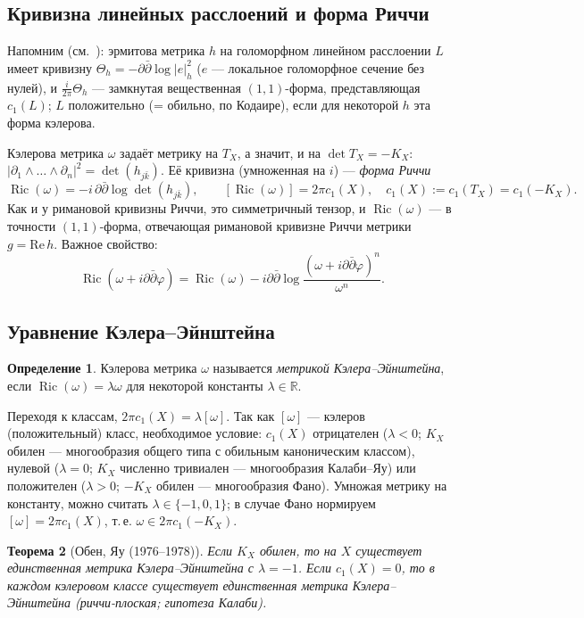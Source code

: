 \documentclass[11pt,a4paper]{article}
\theoremstyle{plain}
\newtheorem{theorem}{Теорема}[section]
\theoremstyle{definition}
\newtheorem{definition}[theorem]{Определение}
\theoremstyle{remark}
\newcommand{\R}{\mathbb{R}}
\DeclareMathOperator{\Ric}{Ric}
\begin{document}
\subsection{Кривизна линейных расслоений и форма Риччи}

Напомним (см.~\cite[гл.~0]{GH}): эрмитова метрика $h$ на голоморфном линейном расслоении $L$ имеет
кривизну $\Theta_h=-\partial\bar\partial\log|e|_h^2$ ($e$ --- локальное голоморфное сечение без нулей),
и $\frac i{2\pi}\Theta_h$ --- замкнутая вещественная $(1,1)$-форма, представляющая $c_1(L)$;
$L$ положительно (= обильно, по Кодаире), если для некоторой $h$ эта форма кэлерова.

Кэлерова метрика $\omega$ задаёт метрику на $T_X$, а значит, и на $\det T_X=-K_X$:
$|\partial_1\wedge\dots\wedge\partial_n|^2=\det(h_{j\bar k})$. Её кривизна (умноженная на $i$) ---
\emph{форма Риччи}
\[
\Ric(\omega)=-i\,\partial\bar\partial\log\det(h_{j\bar k}),\qquad [\Ric(\omega)]=2\pi c_1(X),\quad
c_1(X):=c_1(T_X)=c_1(-K_X).
\]
Как и у римановой кривизны Риччи, это симметричный тензор, и $\Ric(\omega)$ --- в точности
$(1,1)$-форма, отвечающая римановой кривизне Риччи метрики $g=\mathrm{Re}\,h$. Важное свойство:
\[
\Ric(\omega+i\partial\bar\partial\varphi)=\Ric(\omega)-i\partial\bar\partial\log\frac{(\omega+i\partial\bar\partial\varphi)^n}{\omega^n}.
\]

\subsection{Уравнение Кэлера--Эйнштейна}

\begin{definition}
Кэлерова метрика $\omega$ называется \emph{метрикой Кэлера--Эйнштейна}, если
$\Ric(\omega)=\lambda\omega$ для некоторой константы $\lambda\in\R$.
\end{definition}

Переходя к классам, $2\pi c_1(X)=\lambda[\omega]$. Так как $[\omega]$ --- кэлеров (положительный)
класс, необходимое условие: $c_1(X)$ отрицателен ($\lambda<0$; $K_X$ обилен --- многообразия общего
типа с обильным каноническим классом), нулевой ($\lambda=0$; $K_X$ численно тривиален ---
многообразия Калаби--Яу) или положителен ($\lambda>0$; $-K_X$ обилен --- многообразия Фано). Умножая
метрику на константу, можно считать $\lambda\in\{-1,0,1\}$; в случае Фано нормируем
$[\omega]=2\pi c_1(X)$, т.\,е. $\omega\in2\pi c_1(-K_X)$.

\begin{theorem}[Обен, Яу (1976--1978)]
Если $K_X$ обилен, то на $X$ существует единственная метрика Кэлера--Эйнштейна с $\lambda=-1$. Если $c_1(X)=0$, то в
каждом кэлеровом классе существует единственная метрика Кэлера--Эйнштейна \textup{(}риччи-плоская; гипотеза Калаби\textup{)}.
\end{theorem}
\end{document}
